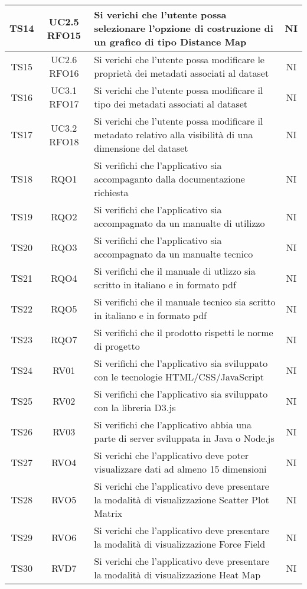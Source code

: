 \documentclass[../piano_di_qualifica.tex]{subfiles}
\begin{document}
\begin{center}
\begin{longtable}{|c|c|p{8.5cm}|c|}
		TS14  & UC2.5 RFO15 & Si verichi che l'utente possa selezionare l’opzione di costruzione di un grafico di tipo Distance Map & NI \\ \hline
		TS15 & UC2.6 RFO16 & Si verichi che l'utente possa modificare le proprietà dei metadati associati al dataset  & NI \\ \hline
		TS16 & UC3.1 RFO17 & Si verichi che l'utente possa modificare il tipo dei metadati associati al dataset & NI \\ \hline
		TS17 & UC3.2 RFO18 & Si verichi che l'utente possa modificare il metadato relativo alla visibilità di una dimensione del dataset & NI \\ \hline
		TS18  & RQO1  & Si verifichi che l'applicativo sia accompaganto dalla documentazione richiesta   & NI \\ \hline
      		TS19  & RQO2  & Si verifichi che l'applicativo sia accompagnato da un manualte di utilizzo  & NI \\ \hline
      		TS20  & RQO3  & Si verifichi che l'applicativo sia accompagnato da un manualte tecnico    & NI \\ \hline
      		TS21  & RQO4  & Si verifichi che il manuale di utlizzo sia scritto in italiano e in formato pdf     & NI \\ \hline
      		TS22  & RQO5  & Si verifichi che il manuale tecnico sia scritto in italiano e in formato pdf  & NI \\ \hline
      		TS23  & RQO7  & Si verifichi che il prodotto rispetti le norme di progetto    & NI \\   \hline
			TS24   & RV01  & Si verifichi che l'applicativo sia sviluppato con le tecnologie HTML/CSS/JavaScript  & NI \\ \hline	
      		TS25   & RV02   & Si verifichi che l'applicativo sia sviluppato con la libreria D3.js   & NI \\ \hline
      		TS26   & RV03    & Si verifichi che l'applicativo abbia una parte di server sviluppata in Java o Node.js   & NI \\ \hline
		TS27  & RVO4 & Si verichi che l’applicativo deve poter visualizzare dati ad almeno 15 dimensioni & NI \\ \hline
		TS28  & RVO5 & Si verichi che l’applicativo deve presentare la modalità di visualizzazione Scatter Plot Matrix & NI \\ \hline
		TS29  & RVO6 & Si verichi che l’applicativo deve presentare la modalità di visualizzazione Force Field & NI \\ \hline
		TS30  & RVD7 & Si verichi che l’applicativo deve presentare la modalità di visualizzazione Heat Map & NI \\ \hline

\end{longtable}
\end{center}
\end{document}
